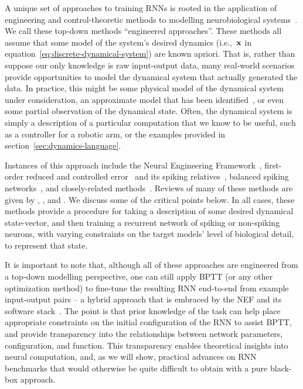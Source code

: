 A unique set of approaches to training RNNs is rooted in the application of engineering and control-theoretic methods to modelling neurobiological systems~\citep{eliasmith1999developing}.
We call these top-down methods ``engineered approaches''.
These methods all assume that some model of the system's desired dynamics (i.e.,~$\mathbf{x}$ in equation~\ref{eq:discrete-dynamical-system}) are known apriori.
That is, rather than suppose our only knowledge is raw input-output data, many real-world scenarios provide opportunities to model the dynamical system that actually generated the data.
In practice, this might be some physical model of the dynamical system under consideration, an approximate model that has been identified~\citep{nelles2013nonlinear}, or even some partial observation of the dynamical state.
Often, the dynamical system is simply a description of a particular computation that we know to be useful, such as a controller for a robotic arm, or the examples provided in section~\ref{sec:dynamics-language}.

Instances of this approach include the Neural Engineering Framework~\citep[NEF;][]{eliasmith2003a, duggins2017incorporating}, first-order reduced and controlled error~\citep[FORCE;][]{sussillo2009generating, depasquale2018full} and its spiking relatives~\citep{thalmeier2016learning, depasquale2016using}, balanced spiking networks~\citep{boerlin2011spike, boerlin2013predictive, schwemmer2015constructing, alemi2018learning}, and closely-related methods~\citep{jaeger2014controlling, gilra2017predicting}.
Reviews of many of these methods are given by \citet{deneve2016efficient}, \citet{abbott2016building}, and \citet{nicola2016supervised}. We discuss some of the critical points below.
In all cases, these methods provide a procedure for taking a description of some desired dynamical state-vector, and then training a recurrent network of spiking or non-spiking neurons, with varying constraints on the target models' level of biological detail, to represent that state.

It is important to note that, although all of these approaches are engineered from a top-down modelling perspective, one can still apply BPTT (or any other optimization method) to fine-tune the resulting RNN end-to-end from example input-output pairs -- a hybrid approach that is embraced by the NEF and its software stack~\citep{rasmussen2018nengodl}.
The point is that prior knowledge of the task can help place appropriate constraints on the initial configuration of the RNN to assist BPTT, and provide transparency into the relationships between network parameters, configuration, and function.
This transparency enables theoretical insights into neural computation, and, as we will show, practical advances on RNN benchmarks that would otherwise be quite difficult to obtain with a pure black-box approach.


